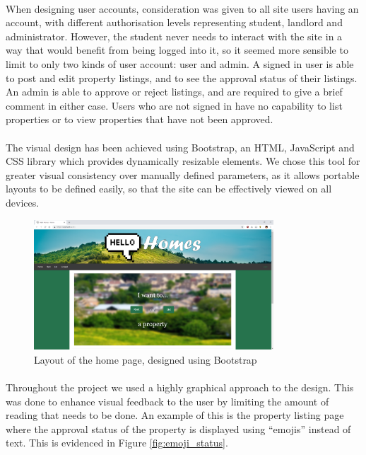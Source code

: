 \documentclass{article}
\begin{document}
    \paragraph{}
        When designing user accounts, consideration was given to all site users having an account, with different authorisation levels representing student, landlord and administrator.
        However, the student never needs to interact with the site in a way that would benefit from being logged into it, so it seemed more sensible to limit to only two kinds of user account: user and admin.
        A signed in user is able to post and edit property listings, and to see the approval status of their listings.
        An admin is able to approve or reject listings, and are required to give a brief comment in either case.
        Users who are not signed in have no capability to list properties or to view properties that have not been approved.

    \paragraph{}
        The visual design has been achieved using Bootstrap, an HTML, JavaScript and CSS library which provides dynamically resizable elements.
        We chose this tool for greater visual consistency over manually defined parameters, as it allows portable layouts to be defined easily, so that the site can be effectively viewed on all devices.

        \begin{figure}[!htb]
            \centering
            \includegraphics[width=0.8\textwidth]{figures/index_page.png}
            \caption[Home page layout]{Layout of the home page, designed using Bootstrap}
            \label{fig:index_page}
        \end{figure}

    \paragraph{}
        Throughout the project we used a highly graphical approach to the design. This was done to enhance visual feedback to the user by limiting the amount of reading that needs to be done.
        An example of this is the property listing page where the approval status of the property is displayed using “emojis” instead of text.
        This is evidenced in Figure \ref{fig:emoji_status}.
\end{document}
